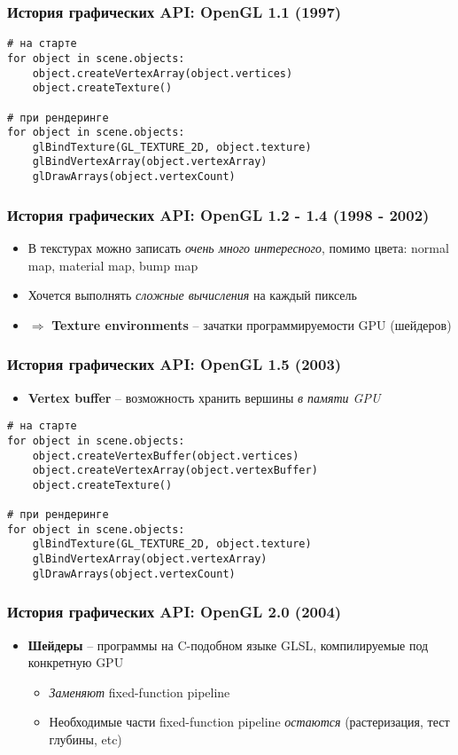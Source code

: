 \documentclass[10pt]{beamer}
\begin{document}
\begin{frame}[fragile]
\frametitle{История графических API: OpenGL 1.1 (1997)}
\begin{verbatim}
# на старте
for object in scene.objects:
    object.createVertexArray(object.vertices)
    object.createTexture()

# при рендеринге
for object in scene.objects:
    glBindTexture(GL_TEXTURE_2D, object.texture)
    glBindVertexArray(object.vertexArray)
    glDrawArrays(object.vertexCount)
\end{verbatim}
\end{frame}

\begin{frame}
\frametitle{История графических API: OpenGL 1.2 - 1.4 (1998 - 2002)}
\begin{itemize}
\item В текстурах можно записать \textit{очень много интересного}, помимо цвета: normal map, material map, bump map
\item Хочется выполнять \textit{сложные вычисления} на каждый пиксель
\pause
\item $\Longrightarrow$ \textbf{Texture environments} -- зачатки программируемости GPU (шейдеров)
\end{itemize}
\end{frame}

\begin{frame}[fragile]
\frametitle{История графических API: OpenGL 1.5 (2003)}
\begin{itemize}
\item \textbf{Vertex buffer} -- возможность хранить вершины \textit{в памяти GPU}
\end{itemize}
\pause
{}
\begin{verbatim}
# на старте
for object in scene.objects:
    object.createVertexBuffer(object.vertices)
    object.createVertexArray(object.vertexBuffer)
    object.createTexture()

# при рендеринге
for object in scene.objects:
    glBindTexture(GL_TEXTURE_2D, object.texture)
    glBindVertexArray(object.vertexArray)
    glDrawArrays(object.vertexCount)
\end{verbatim}
\end{frame}

\begin{frame}
\frametitle{История графических API: OpenGL 2.0 (2004)}
\begin{itemize}
\item \textbf{Шейдеры} -- программы на C-подобном языке GLSL, компилируемые под конкретную GPU
\begin{itemize}
\item \textit{Заменяют} fixed-function pipeline
\item Необходимые части fixed-function pipeline \textit{остаются} (растеризация, тест глубины, etc)
\end{itemize}
\end{itemize}
\end{frame}
\end{document}
